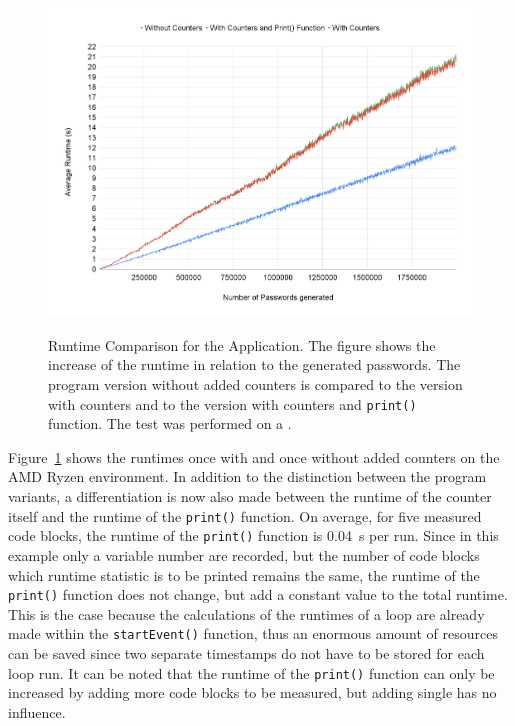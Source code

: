 \begin{figure}[t]
  \centering
  \caption[Runtime Comparison for the \VARPASSWORDGEN Application.]{Runtime Comparison for the \VARPASSWORDGEN Application. The figure shows the increase of the runtime in relation to the generated passwords. The program version without added counters is compared to the version with counters and to the version with counters and \lstinline{print()} function. The test was performed on a \AMD. } 
  \includegraphics[width=1\textwidth]{graphics/e_variable_password_comparison.png}
  \label{fig:e:variable_password_comparison}
\end{figure}

Figure~\ref{fig:e:variable_password_comparison} shows the runtimes once with and once without added counters on the AMD Ryzen environment. In addition to the distinction between the program variants, a differentiation is now also made between the runtime of the counter itself and the runtime of the \lstinline{print()} function. On average, for five measured code blocks, the runtime of the \lstinline{print()} function is \SI{0.04}{\second} per run. Since in this example only a variable number \MEASUREVALUES are recorded, but the number of code blocks which runtime statistic is to be printed remains the same, the runtime of the \lstinline{print()} function does not change, but add a constant value to the total runtime. This is the case because the calculations of the runtimes of a loop are already made within the \lstinline{startEvent()} function, thus an enormous amount of resources can be saved since two separate timestamps do not have to be stored for each loop run. It can be noted that the runtime of the \lstinline{print()} function can only be increased by adding more code blocks to be measured, but adding single \MEASUREVALUES has no influence.

